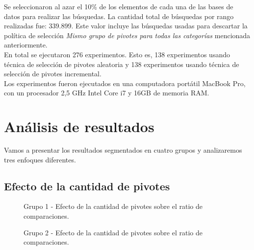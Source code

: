 Se seleccionaron al azar el 10\% de los elementos de cada una de las bases de datos para realizar las b\'usquedas. La cantidad total de b\'usquedas por rango realizadas fue: 339.899. Este valor incluye las b\'usquedas usadas para descartar la pol\'itica de selecci\'on \textit{Mismo grupo de pivotes para todas las categor\'ias } mencionada anteriormente.\\

En total se ejecutaron 276 experimentos. Esto es, 138 experimentos usando t\'ecnica de selecci\'on de pivotes aleatoria y 138 experimentos usando t\'ecnica de selecci\'on de pivotes incremental.\\

Los experimentos fueron ejecutados en una computadora port\'atil MacBook Pro, con un procesador 2,5 GHz Intel Core i7 y 16GB de memoria RAM.

\section{An\'alisis de resultados}

Vamos a presentar los resultados segmentados en cuatro grupos y analizaremos tres enfoques diferentes.\\

\subsection{Efecto de la cantidad de pivotes}


\begin{figure}[tb]
\centering
{}
		\caption{\small Grupo 1 - Efecto de la cantidad de pivotes sobre el ratio de comparaciones.}
		\label{fig:EP-g1}
\end{figure}

\begin{figure}[tb]
\centering
{}
		\caption{\small Grupo 2 - Efecto de la cantidad de pivotes sobre el ratio de comparaciones.}
		\label{fig:EP-g2}
\end{figure}

